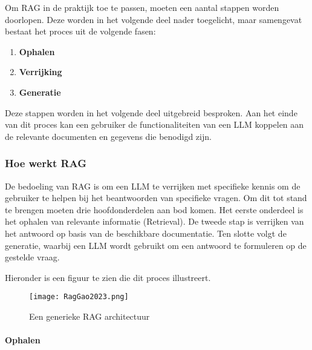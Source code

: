     Om RAG in de praktijk toe te passen, moeten een aantal stappen worden doorlopen. Deze worden in het volgende deel nader toegelicht, maar samengevat bestaat het proces uit de volgende fasen:
    
    \begin{enumerate}
        \item \textbf{Ophalen}
        \item \textbf{Verrijking}
        \item \textbf{Generatie}
    \end{enumerate}
    
    Deze stappen worden in het volgende deel uitgebreid besproken. Aan het einde van dit proces kan een gebruiker de functionaliteiten van een LLM koppelen aan de relevante documenten en gegevens die benodigd zijn.
    
    \subsubsection{Hoe werkt RAG}
    
    De bedoeling van RAG is om een LLM te verrijken met specifieke kennis om de gebruiker te helpen bij het beantwoorden van specifieke vragen. Om dit tot stand te brengen moeten drie hoofdonderdelen aan bod komen. Het eerste onderdeel is het ophalen van relevante informatie (Retrieval). De tweede stap is verrijken van het antwoord op basis van de beschikbare documentatie. Ten slotte volgt de generatie, waarbij een LLM wordt gebruikt om een antwoord te formuleren op de gestelde vraag.
    
    Hieronder is een figuur te zien die dit proces illustreert.
    
    \begin{figure}[H]
        \centering
        \texttt{[image: RagGao2023.png]}
        \caption{Een generieke RAG architectuur \cite{Gao2023}}
        \label{fig:Rag process}
    \end{figure}
    
    \paragraph{Ophalen}
    
    
